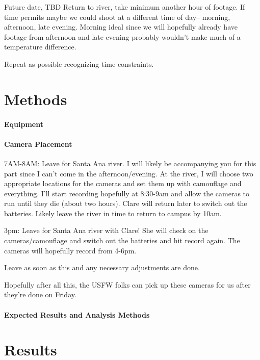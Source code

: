 \documentclass{tufte-handout}\usepackage[]{graphicx}\usepackage[]{color}
\begin{document}
Future date, TBD
Return to river, take minimum another hour of footage. If time permits maybe we could shoot at a different time of day-- morning, afternoon, late evening. Morning ideal since we will hopefully already have footage from afternoon and late evening probably wouldn't make much of a temperature difference. 

Repeat as possible recognizing time constraints.

\section{Methods}

\paragraph{Equipment}

\paragraph{Camera Placement}

7AM-8AM: Leave for Santa Ana river. I will likely be accompanying you for this part since I can’t come in the afternoon/evening. 
At the river, I will choose two appropriate locations for the cameras and set them up with camouflage and everything. I’ll start recording hopefully at 8:30-9am and allow the cameras to run until they die (about two hours). Clare will return later to switch out the batteries.
Likely leave the river in time to return to campus by 10am.

3pm: Leave for Santa Ana river with Clare! She will check on the cameras/camouflage and switch out the batteries and hit record again. The cameras will hopefully record from 4-6pm.

Leave as soon as this and any necessary adjustments are done. 


Hopefully after all this, the USFW folks can pick up these cameras for us after they're done on Friday.

\paragraph{Expected Results and Analysis Methods}

\section{Results}
\end{document}
